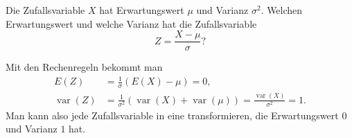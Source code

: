 Die Zufallsvariable $X$ hat Erwartungswert $\mu$ und Varianz $\sigma^2$.
Welchen Erwartungswert und welche Varianz hat die Zufallsvariable
\[
Z=\frac{X-\mu}{\sigma}?
\]

\begin{loesung}
Mit den Rechenregeln bekommt man
\begin{align*}
E(Z)&=
\frac1{\sigma}(E(X)-\mu)=0,\\
\operatorname{var}(Z)&=
\frac1{\sigma^2}(\operatorname{var}(X)+\operatorname{var}(\mu))
=
\frac{\operatorname{var}(X)}{\sigma^2}=1.
\end{align*}
Man kann also jede Zufallsvariable in eine transformieren, die Erwartungswert $0$
und Varianz $1$ hat.
\end{loesung}

